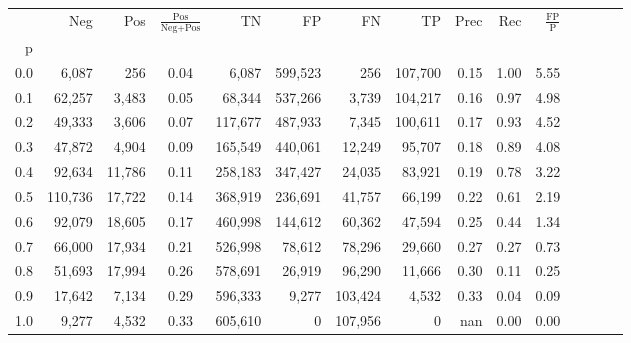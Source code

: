 \begin{tabular}{rrrcrrrrrrrrrrr}
\toprule
{} &      Neg &     Pos & $\frac{\text{Pos}}{\text{Neg}+\text{Pos}}$ &       TN &       FP &       FN &       TP &  Prec &   Rec & $\frac{\text{FP}}{\text{P}}$ \\
p   &          &         &                                            &          &          &          &          &       &       &                              \\
\midrule
0.0 &    6,087 &     256 &                                       0.04 &    6,087 &  599,523 &      256 &  107,700 &  0.15 &  1.00 &                         5.55 \\
0.1 &   62,257 &   3,483 &                                       0.05 &   68,344 &  537,266 &    3,739 &  104,217 &  0.16 &  0.97 &                         4.98 \\
0.2 &   49,333 &   3,606 &                                       0.07 &  117,677 &  487,933 &    7,345 &  100,611 &  0.17 &  0.93 &                         4.52 \\
0.3 &   47,872 &   4,904 &                                       0.09 &  165,549 &  440,061 &   12,249 &   95,707 &  0.18 &  0.89 &                         4.08 \\
0.4 &   92,634 &  11,786 &                                       0.11 &  258,183 &  347,427 &   24,035 &   83,921 &  0.19 &  0.78 &                         3.22 \\
0.5 &  110,736 &  17,722 &                                       0.14 &  368,919 &  236,691 &   41,757 &   66,199 &  0.22 &  0.61 &                         2.19 \\
0.6 &   92,079 &  18,605 &                                       0.17 &  460,998 &  144,612 &   60,362 &   47,594 &  0.25 &  0.44 &                         1.34 \\
0.7 &   66,000 &  17,934 &                                       0.21 &  526,998 &   78,612 &   78,296 &   29,660 &  0.27 &  0.27 &                         0.73 \\
0.8 &   51,693 &  17,994 &                                       0.26 &  578,691 &   26,919 &   96,290 &   11,666 &  0.30 &  0.11 &                         0.25 \\
0.9 &   17,642 &   7,134 &                                       0.29 &  596,333 &    9,277 &  103,424 &    4,532 &  0.33 &  0.04 &                         0.09 \\
1.0 &    9,277 &   4,532 &                                       0.33 &  605,610 &        0 &  107,956 &        0 &   nan &  0.00 &                         0.00 \\
\bottomrule
\end{tabular}
